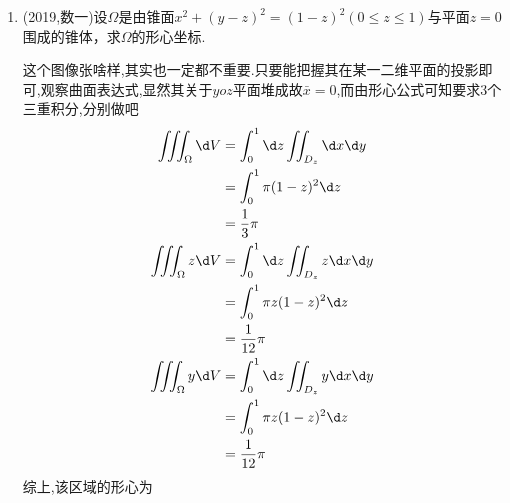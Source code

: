 \documentclass[12pt, a4paper, oneside, UTF8]{ctexbook}
\begin{document}
\begin{enumerate}[label=\arabic*.]
    \item (2019,数一)设$\Omega$是由锥面$x^{2}+(y-z)^{2}=(1-z)^{2}(0\leq z\leq 1)$与平面$z=0$围成的锥体，求$\Omega$的形心坐标.
    
    \begin{solution}
    这个图像张啥样,其实也一定都不重要.只要能把握其在某一二维平面的投影即可,观察曲面表达式,显然其关于$yoz$平面堆成故$\bar{x}=0$,而由形心公式可知要求3个三重积分,分别做吧 
    \begin{align*}
        \iiint_{\Omega}\d V &= \int_{0}^{1}\d z\iint_{D_z}\d x\d y \\
        &=\int_{0}^{1}\pi(1-z)^2\d z \\
        &=\frac{1}{3}\pi \\
        \iiint_{\Omega}z\d V &= \int_{0}^{1}\d z\iint_{D_z}z\d x\d y \\
        &=\int_{0}^{1}\pi z(1-z)^2\d z \\ 
        &=\frac{1}{12}\pi \\
        \iiint_{\Omega}y\d V &= \int_{0}^{1}\d z\iint_{D_z}y\d x\d y \\
        &=\int_{0}^{1}\pi z(1-z)^2\d z \\
        &=\frac{1}{12}\pi
    \end{align*}
    综上,该区域的形心为
    \begin{center}
    \end{center}
    \end{solution}
\end{enumerate}

\newpage
\end{document}
